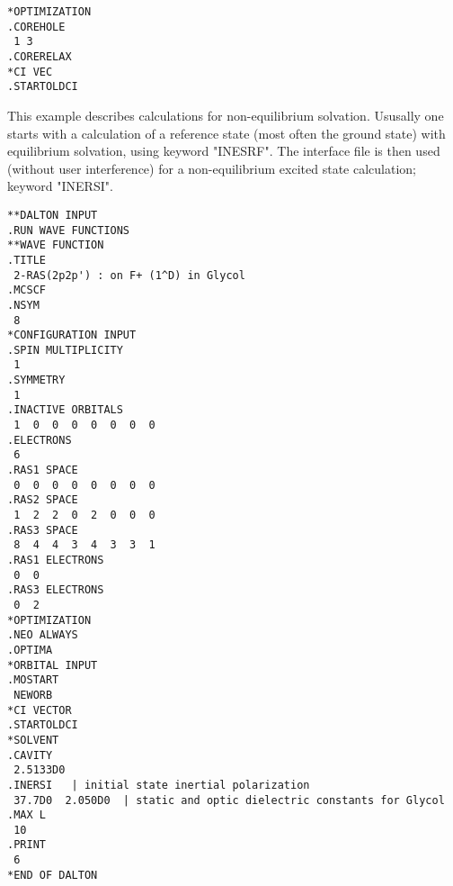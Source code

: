 \begin{verbatim}
*OPTIMIZATION
.COREHOLE
 1 3
.CORERELAX
*CI VEC
.STARTOLDCI
\end{verbatim}
\label{sirius_ex7}

\begin{center}
\end{center}

This example describes calculations for non-equilibrium
solvation.
Ususally one starts with a calculation of a reference state
(most often the ground state) with equilibrium solvation, using
keyword "INESRF". The interface file is then used (without user 
interference) for a non-equilibrium excited state calculation; keyword
"INERSI". 

\begin{verbatim}
**DALTON INPUT
.RUN WAVE FUNCTIONS
**WAVE FUNCTION
.TITLE
 2-RAS(2p2p') : on F+ (1^D) in Glycol 
.MCSCF
.NSYM
 8
*CONFIGURATION INPUT
.SPIN MULTIPLICITY
 1
.SYMMETRY
 1
.INACTIVE ORBITALS
 1  0  0  0  0  0  0  0 
.ELECTRONS
 6
.RAS1 SPACE
 0  0  0  0  0  0  0  0
.RAS2 SPACE
 1  2  2  0  2  0  0  0
.RAS3 SPACE
 8  4  4  3  4  3  3  1
.RAS1 ELECTRONS 
 0  0 
.RAS3 ELECTRONS 
 0  2 
*OPTIMIZATION
.NEO ALWAYS
.OPTIMA
*ORBITAL INPUT
.MOSTART
 NEWORB
*CI VECTOR
.STARTOLDCI
*SOLVENT
.CAVITY
 2.5133D0
.INERSI   | initial state inertial polarization
 37.7D0  2.050D0  | static and optic dielectric constants for Glycol
.MAX L
 10
.PRINT
 6
*END OF DALTON
\end{verbatim}
\label{sirius_ex8}
 
